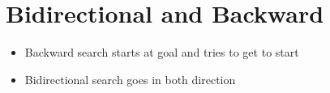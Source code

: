 \section{Bidirectional and Backward}

  \begin{itemize}
    \item Backward search starts at goal and tries to get to start
    \item Bidirectional search goes in both direction
  \end{itemize}